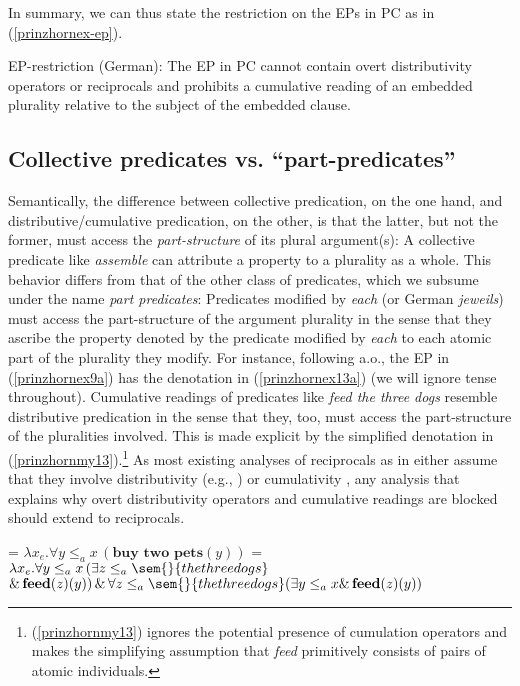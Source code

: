 \documentclass[output=paper]{langscibook}
\begin{document}
In summary, we can thus state the restriction on the EPs in PC as in (\ref{prinzhornex-ep}).  


\ea EP-restriction (German):  The EP in PC cannot contain overt distributivity operators or reciprocals and prohibits a cumulative reading of an embedded plurality relative to the subject of the embedded clause. \label{prinzhornex-ep} \z

\subsection{Collective predicates vs. “part-predicates”}\label{prinzhornsec:2.2}

Semantically, the difference between collective predication, on the one hand,  and distributive/cumulative predication, on the other, is that the latter, but not the former, must access the \textit{part-structure} of its plural argument(s): A collective predicate like \textit{assemble} can attribute a property to a plurality as a whole. This behavior differs from that of the other class of predicates, which we subsume under the name \textit{part predicates}:  Predicates modified by \textit{each} (or German \textit{jeweils}) must access the part-structure of the argument plurality in the sense that they ascribe the property denoted by the predicate modified by \textit{each} to each atomic part of the plurality they modify.  For instance, following \citet{Link:1987} a.o., the EP in (\ref{prinzhornex9a}) has the denotation in (\ref{prinzhornex13a}) (we will ignore tense throughout). Cumulative readings of predicates like \textit{feed the three dogs} resemble distributive predication in the sense that they, too, must access the part-structure of the pluralities involved. This is made explicit by the simplified denotation in (\ref{prinzhornmy13}).\footnote{(\ref{prinzhornmy13}) ignores the potential presence of cumulation operators and makes the simplifying assumption that \textit{feed} primitively consists of pairs of atomic individuals.} 
As most existing analyses of reciprocals as in  either assume that they involve distributivity (e.g., \citealt{Heim:1991}) or cumulativity \citep{Beck:2001}, any analysis that explains why overt distributivity operators and cumulative readings are blocked should extend to reciprocals.

\ea	 
\ea {} = $\lambda x_{e}. \forall y \le_{a} x \,(\textbf{buy two pets}(y))$\label{prinzhornex13a}
\ex	{} = $\lambda x_{e}. \forall y \le_{a} x \,(\exists z \le_{a} \sem{}{the three dogs}$\\$ \&\,\textbf{feed}(z)(y)) \,\&\, \forall z \le_{a} \sem{}{the three dogs} (\exists y \le_{a} x \&\, \textbf{feed}(z)(y))$\label{prinzhornmy13}
\z\z
\end{document}
